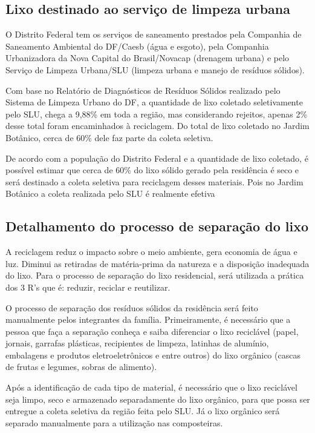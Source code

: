 \subsection{Lixo destinado ao serviço de limpeza urbana}

	O Distrito Federal tem os serviços de saneamento prestados pela Companhia de Saneamento Ambiental do DF/Caesb (água e esgoto), pela Companhia Urbanizadora da Nova Capital do Brasil/Novacap (drenagem urbana) e pelo Serviço de Limpeza Urbana/SLU (limpeza urbana e manejo de resíduos sólidos).

	Com base no Relatório de Diagnósticos de Resíduos Sólidos realizado pelo Sistema de Limpeza Urbano do DF, a quantidade de lixo coletado seletivamente pelo SLU, chega a 9,88\% em toda a região, mas considerando rejeitos, apenas 2\% desse total foram encaminhados à reciclagem. Do total de lixo coletado no Jardim Botânico, cerca de 60\% dele faz parte da coleta seletiva.

	De acordo com a população do Distrito Federal e a quantidade de lixo coletado, é possível estimar que cerca de 60\% do lixo sólido gerado pela residência é seco e será destinado a coleta seletiva para reciclagem desses materiais. Pois no Jardim Botânico a coleta realizada pelo SLU é realmente efetiva

\subsection{Detalhamento do processo de separação do lixo}

	A reciclagem reduz o impacto sobre o meio ambiente, gera economia de água e luz. Diminui as retiradas de matéria-prima da natureza e a disposição inadequada do lixo. Para o processo de separação do lixo residencial, será utilizada a prática dos 3 R's que é: reduzir, reciclar e reutilizar.

	O processo de separação dos resíduos sólidos da residência será feito manualmente pelos integrantes da família. Primeiramente, é necessário que a pessoa que faça a separação conheça e saiba diferenciar o lixo reciclável (papel, jornais, garrafas plásticas, recipientes de limpeza, latinhas de alumínio, embalagens e produtos eletroeletrônicos e entre outros) do lixo orgânico (cascas de frutas e legumes, sobras de alimento).

	Após a identificação de cada tipo de material, é necessário que o lixo reciclável seja limpo, seco e armazenado separadamente do lixo orgânico, para que possa ser entregue a coleta seletiva da região feita pelo SLU. Já o lixo orgânico será separado manualmente para a utilização nas composteiras.

